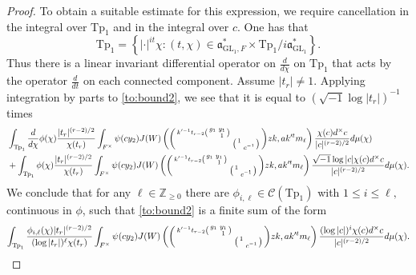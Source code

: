 \documentclass[12pt]{amsart}
\theoremstyle{remark}
\numberwithin{equation}{section}
\newcommand{\GL}{\mathrm{GL}}
\newcommand{\ZZ}{\mathbb{Z}}
\theoremstyle{definition}
\newenvironment{psmatrix}
  {\left(\begin{smallmatrix}}
  {\end{smallmatrix}\right)}
\numberwithin{equation}{subsection}
\begin{document}
\begin{proof}
To obtain a suitable estimate for this expression, we require cancellation in the integral over $\mathrm{Tp}_1$ and in the integral over $c.$
One has that
$$
\mathrm{Tp}_1=\left\{|\cdot|^{it}\chi: (t,\chi) \in \mathfrak{a}_{\GL_1,F}^* \times \mathrm{Tp}_1/i\mathfrak{a}_{\GL_1}^*\right\}.
$$ 
Thus there is a linear invariant differential operator on $\frac{d}{d\chi}$ on $\mathrm{Tp}_1$ that acts by the operator $\frac{d}{dt}$ on each connected component.  Assume $|t_r| \neq 1.$ Applying integration by parts to \eqref{to:bound2}, we see that it is equal to $(\sqrt{-1} \log |t_r|)^{-1}$ times
\begin{align*}
&\int_{\mathrm{Tp}_1}\frac{d}{d \chi}\phi(\chi)\frac{|t_r|^{(r-2)/2}}{\chi(t_r)}\int_{F^\times}\psi(cy_2)
J(W)\left(\begin{psmatrix}k'^{-1}t_{r-2}\begin{psmatrix}  g_1 &  y_1 \\ &1\end{psmatrix}& \\ &  \begin{psmatrix} 1 & \\ & c^{-1} \end{psmatrix} \end{psmatrix}zk,ak'^tm_\ell \right)
\frac{ \chi(c) d^\times c}{|c|^{(r-2)/2}}d\mu( \chi)\\
&+\int_{\mathrm{Tp}_1}\phi(\chi)\frac{|t_r|^{(r-2)/2}}{\chi(t_r)}\int_{F^\times}\psi(cy_2)
J(W)\left(\begin{psmatrix}k'^{-1}t_{r-2}\begin{psmatrix}  g_1 &  y_1 \\ &1\end{psmatrix}& \\ &  \begin{psmatrix} 1 & \\ & c^{-1} \end{psmatrix} \end{psmatrix}zk,ak'^tm_\ell \right)
\frac{ \sqrt{-1}\log|c|\chi(c) d^\times c}{|c|^{(r-2)/2}}d\mu( \chi).
\end{align*}
We conclude that for any $\ell \in \ZZ_{\geq 0}$ there are $\phi_{i,\ell} \in \mathcal{C}(\mathrm{Tp}_1)$ with $1 \leq i \leq \ell,$ continuous in $\phi$, such that \eqref{to:bound2} is a finite sum of the form
\begin{align} \label{to:bound3}
\int_{\mathrm{Tp}_1}\frac{\phi_{i,\ell}(\chi)|t_r|^{(r-2)/2}}{(\log|t_r|)^\ell\chi(t_r)}\int_{F^\times}\psi(cy_2)
J(W)\left(\begin{psmatrix}k'^{-1}t_{r-2}\begin{psmatrix}  g_1 &  y_1 \\ &1\end{psmatrix}& \\ &  \begin{psmatrix} 1 & \\ & c^{-1} \end{psmatrix} \end{psmatrix}zk,ak'^tm_\ell \right)
\frac{(\log|c|)^i\chi(c) d^\times c}{|c|^{(r-2)/2}}d\mu( \chi).
\end{align}


\end{proof}
\end{document}

